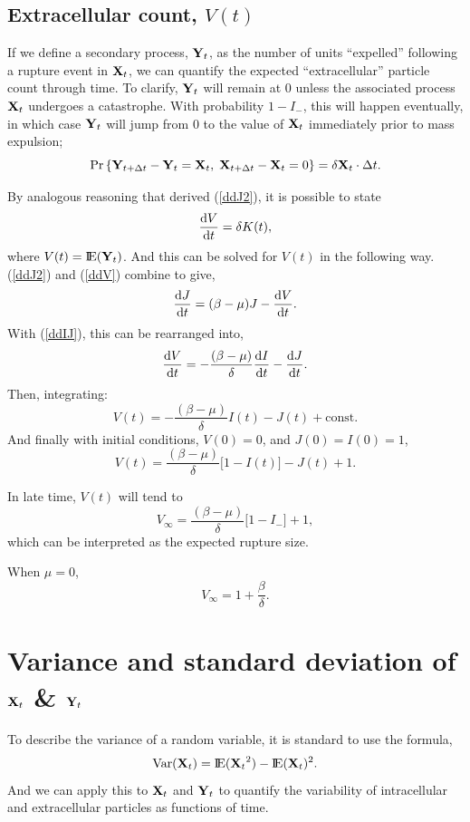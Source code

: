 \subsection{Extracellular count, $V(t)$}

If we define a secondary process, ${{\bf Y}_t}$, as the number of units ``expelled'' following a rupture event in ${{\bf X}_t}$, we can quantify the expected ``extracellular'' particle count through time. To clarify, ${{\bf Y}_t}$ will remain at 0 unless the associated process ${{\bf X}_t}$ undergoes a catastrophe. With probability $1-I_-$, this will happen eventually, in which case ${{\bf Y}_t}$ will jump from 0 to the value of ${{\bf X}_t}$ immediately prior to mass expulsion;
$${\text{Pr}\left\{{\bf Y}_{t+\Delta t}-{{\bf Y}_t} = {{\bf X}_t},\; {\bf X}_{t+\Delta t}-{{\bf X}_t}=0\right\}} = \delta{{\bf X}_t}\cdot\Delta t.$$



\noindent
By analogous reasoning that derived (\ref{ddJ2}), it is possible to state
\begin{equation}
\label{ddV}
\displaystyle\frac{{\rm d} V}{{\rm d} t} =  \delta K(t),
\end{equation}
where $V(t) = {\rm I}\!{\rm E}({{\bf Y}_t})$.
And this can be solved for $V(t)$ in the following way. (\ref{ddJ2}) and (\ref{ddV}) combine to give,
$$\displaystyle\frac{{\rm d} J}{{\rm d} t} = (\beta - \mu) J - \displaystyle\frac{{\rm d} V}{{\rm d} t}.$$
With (\ref{ddIJ}), this can be rearranged into,
$$\displaystyle\frac{{\rm d} V}{{\rm d} t} = -\frac{(\beta - \mu)}{\delta}\displaystyle\frac{{\rm d} I}{{\rm d} t} - \displaystyle\frac{{\rm d} J}{{\rm d} t}.$$ 
Then, integrating:
$$V(t) = -\frac{(\beta - \mu)}{\delta}I(t) - J(t) + \text{const}.$$
And finally with initial conditions, $V(0) = 0$, and $J(0)=I(0)=1$,
\begin{equation*}
\label{Voft}
V(t) = \frac{(\beta - \mu)}{\delta}\big[1-I(t)\big] -J(t)+1.
\end{equation*}




\noindent
In late time, $V(t)$ will tend to
$$V_{\infty} =  \frac{(\beta - \mu)}{\delta}\big[1-I_-\big] +1,$$
which can be interpreted as the expected rupture size. 

When $\mu = 0$,
$$V_\infty = 1 +\frac{\beta}{\delta}.$$





\section{Variance and standard deviation of ${{\bf X}_t}$ \& ${{\bf Y}_t}$}

To describe the variance of a random variable, it is standard to use the formula, 
\begin{equation*}
\text{Var}({{\bf X}_t}) = {\rm I}\!{\rm E}({{\bf X}_t}^2) - {\rm I}\!{\rm E}({{\bf X}_t})^2.
\end{equation*}
And we can apply this to ${{\bf X}_t}$ and ${{\bf Y}_t}$ to quantify the variability of intracellular and extracellular particles as functions of time. 

